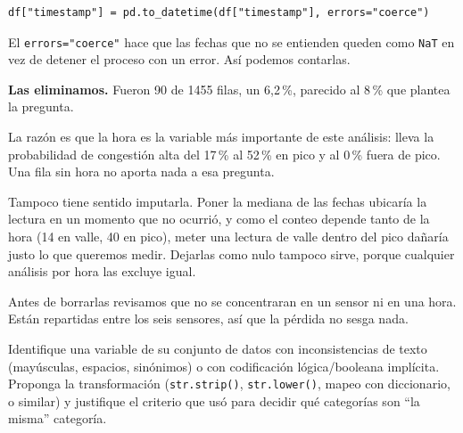 \documentclass[11pt]{article}
\begin{document}
\begin{respuesta}[Respuesta 2.2]
\begin{verbatim}
df["timestamp"] = pd.to_datetime(df["timestamp"], errors="coerce")
\end{verbatim}

El \texttt{errors="coerce"} hace que las fechas que no se entienden queden como \texttt{NaT} en vez de detener el proceso con un error. Así podemos contarlas.

\medskip
\noindent\textbf{Las eliminamos.} Fueron 90 de 1455 filas, un 6,2\,\%, parecido al 8\,\% que plantea la pregunta.

La razón es que la hora es la variable más importante de este análisis: lleva la probabilidad de congestión alta del 17\,\% al 52\,\% en pico y al 0\,\% fuera de pico. Una fila sin hora no aporta nada a esa pregunta.

Tampoco tiene sentido imputarla. Poner la mediana de las fechas ubicaría la lectura en un momento que no ocurrió, y como el conteo depende tanto de la hora (14 en valle, 40 en pico), meter una lectura de valle dentro del pico dañaría justo lo que queremos medir. Dejarlas como nulo tampoco sirve, porque cualquier análisis por hora las excluye igual.

Antes de borrarlas revisamos que no se concentraran en un sensor ni en una hora. Están repartidas entre los seis sensores, así que la pérdida no sesga nada.
\end{respuesta}


\begin{pregunta}
Identifique una variable de su conjunto de datos con inconsistencias de texto (mayúsculas, espacios, sinónimos) o con codificación lógica/booleana implícita. Proponga la transformación (\texttt{str.strip()}, \texttt{str.lower()}, mapeo con diccionario, o similar) y justifique el criterio que usó para decidir qué categorías son ``la misma'' categoría.
\end{pregunta}
\end{document}
